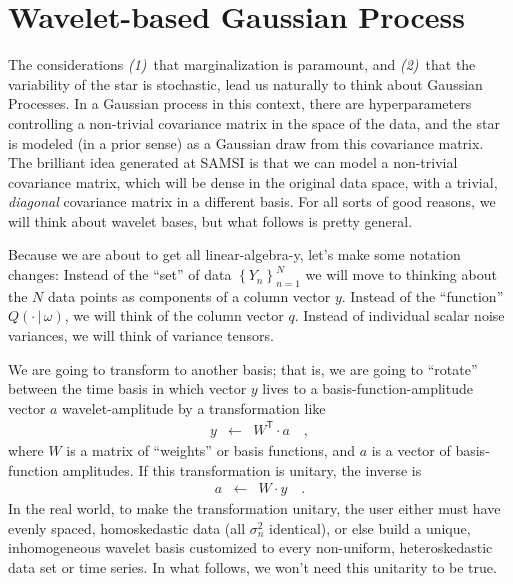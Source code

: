\documentclass[12pt,letterpaper]{article}
\newcommand{\given}{\,|\,}
\newcommand{\setof}[1]{\left\{{#1}\right\}}
\newcommand{\transpose}[1]{{#1}^{\mathsf{T}}}
\newcommand{\datum}{Y}
\newcommand{\data}{\setof{\datum_n}_{n=1}^N}
\newcommand{\datavec}{y}
\newcommand{\exofn}{Q}
\newcommand{\exovec}{q}
\newcommand{\exopars}{\omega}
\newcommand{\variance}{\sigma^2}
\newcommand{\wavevec}{a}
\newcommand{\weightmatrix}{W}
\begin{document}
\section{Wavelet-based Gaussian Process}

The considerations \textsl{(1)}~that marginalization is paramount,
and \textsl{(2)}~that the variability of the star is stochastic,
lead us naturally to think about Gaussian Processes.
In a Gaussian process in this context,
there are hyperparameters controlling a non-trivial covariance matrix in the space of the data,
and the star is modeled (in a prior sense) as a Gaussian draw from this covariance matrix.
The brilliant idea generated at SAMSI is that we can model a non-trivial covariance matrix,
which will be dense in the original data space,
with a trivial, \emph{diagonal} covariance matrix in a different basis.
For all sorts of good reasons, we will think about wavelet bases,
but what follows is pretty general.

Because we are about to get all linear-algebra-y, let's make some
notation changes: Instead of the ``set'' of data $\data$ we will move
to thinking about the $N$ data points as components of a column vector
$\datavec$.  Instead of the ``function'' $\exofn(\cdot\given\exopars)$,
we will think of the column vector $\exovec$.
Instead of individual scalar noise variances,
we will think of variance tensors.

We are going to transform to another basis;
that is, we are going to ``rotate'' between the time basis in which vector $y$ lives
to a basis-function-amplitude vector $\wavevec$ wavelet-amplitude by a transformation like
\begin{eqnarray}
\datavec
  &\leftarrow& \transpose{\weightmatrix}\cdot\wavevec
\quad ,
\end{eqnarray}
where $\weightmatrix$ is a matrix of ``weights'' or basis functions,
and $\wavevec$ is a vector of basis-function amplitudes.
If this transformation is unitary, the inverse is
\begin{eqnarray}
\wavevec
  &\leftarrow& \weightmatrix\cdot\datavec
\quad .
\end{eqnarray}
In the real world, to make the transformation unitary,
the user either must have evenly spaced, homoskedastic data (all $\variance_n$ identical),
or else build a unique, inhomogeneous wavelet basis
customized to every non-uniform, heteroskedastic data set or time series.
In what follows, we won't need this unitarity to be true.
\end{document}
